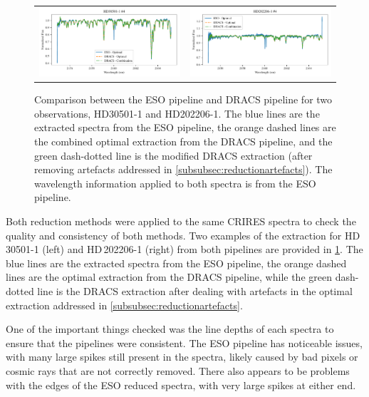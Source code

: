 \begin{figure}
\begin{tabular}{cc}
        \includegraphics[width=0.47\linewidth]{figures/reduction/pipeline_compare/pipeline_compare_HD30501-1_chip_4} & \includegraphics[width=0.47\linewidth]{figures/reduction/pipeline_compare/pipeline_compare_HD202206-1_chip_4}\\
    \end{tabular}
    \caption[Comparision between {DRACS} and {ESOs} reduction pipeline output.]{Comparison between the {ESO} pipeline and {DRACS} pipeline for two observations, {HD30501-1} and {HD202206-1}.
        The blue lines are the extracted spectra from the {ESO} pipeline, the orange dashed lines are the combined optimal extraction from the {DRACS} pipeline, and the green dash-dotted line is the modified {DRACS} extraction (after removing artefacts addressed in \cref{subsubsec:reductionartefacts}).
        The wavelength information applied to both spectra is from the {ESO} pipeline.}
    \label{fig:reduction-comparison}
\end{figure}

Both reduction methods were applied to the same {CRIRES} spectra to check the quality and consistency of both methods.
Two examples of the extraction for HD\,30501-1 (left) and HD\,202206-1 (right) from both pipelines are provided in \cref{fig:reduction-comparison}.
The blue lines are the extracted spectra from the {ESO} pipeline, the orange dashed lines are the optimal extraction from the {DRACS} pipeline, while the green dash-dotted line is the {DRACS} extraction after dealing with artefacts in the optimal extraction addressed in \cref{subsubsec:reductionartefacts}.

One of the important things checked was the line depths of each spectra to ensure that the pipelines were consistent.
The {ESO} pipeline has noticeable issues, with many large spikes still present in the spectra, likely caused by bad pixels or cosmic rays that are not correctly removed.
There also appears to be problems with the edges of the {ESO} reduced spectra, with very large spikes at either end.

